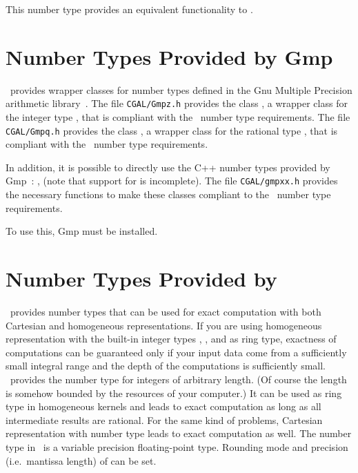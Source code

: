 This number type provides an equivalent functionality to .


\section{Number Types Provided by {\sc Gmp}}

\cgal\ provides wrapper classes for number types defined in the
{\sc Gnu} Multiple Precision arithmetic library~\cite{g-ggmpa-}.
The file {\tt  CGAL/Gmpz.h} provides the class ,
a wrapper class for the integer type , that is compliant with the
\cgal\ number type requirements. The file {\tt  CGAL/Gmpq.h} provides the class ,
a wrapper class for the rational type , that is compliant
with the
\cgal\ number type requirements.

In addition, it is possible to directly use the C++ number types provided by
{\sc Gmp}~: ,  (note that support for
 is incomplete).  The file {\tt CGAL/gmpxx.h} provides the
necessary functions to make these classes compliant to the \cgal\ number type
requirements.

To use this, {\sc Gmp} must be installed.


\section{Number Types Provided by \leda}
\label{leda-nt}

\leda\ provides number types that can be used for exact computation 
with both Cartesian and homogeneous representations.  If you are using
homogeneous representation with the built-in integer types
, , and  as ring type, exactness of
computations can be guaranteed only if your input data come from a
sufficiently small integral range and the depth of the computations is
sufficiently small.  \leda\ provides the number type  for
integers of arbitrary length. (Of course the length is
somehow bounded by the resources of your computer.)  It can be used as
ring type in homogeneous kernels and leads to exact
computation as long as all intermediate results are rational.  For the
same kind of problems, Cartesian representation with number type
 leads to exact computation as well.
The number type  in \leda\ is a variable precision
floating-point type. Rounding mode and precision (i.e.\ mantissa length) of
 can be set. 

